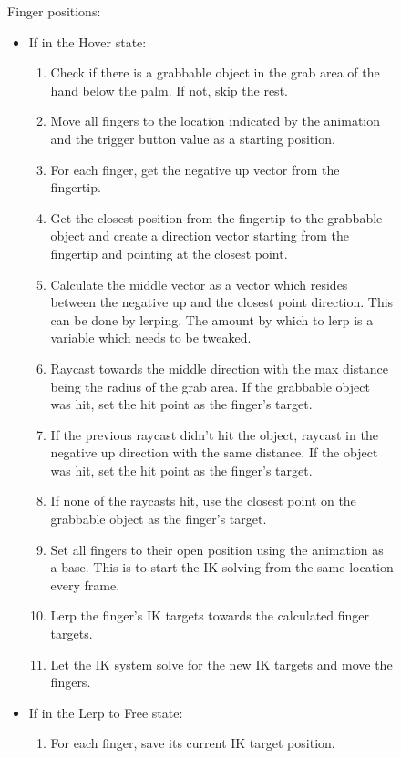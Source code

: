 \begin{figure}[H]
\centering
\footnotesize
\begin{flushleft}
Finger positions:
\end{flushleft}
\begin{itemize}[noitemsep]
\item If in the Hover state:
\begin{enumerate}[noitemsep]
\item Check if there is a grabbable object in the grab area of the hand below the palm. If not, skip the rest.
\item Move all fingers to the location indicated by the animation and the trigger button value as a starting position.
\item For each finger, get the negative up vector from the fingertip.
\item Get the closest position from the fingertip to the grabbable object and create a direction vector starting from the fingertip and pointing at the closest point.
\item Calculate the middle vector as a vector which resides between the negative up and the closest point direction. This can be done by lerping. The amount by which to lerp is a variable which needs to be tweaked.
\item Raycast towards the middle direction with the max distance being the radius of the grab area. If the grabbable object was hit, set the hit point as the finger's target.
\item If the previous raycast didn't hit the object, raycast in the negative up direction with the same distance. If the object was hit, set the hit point as the finger's target.
\item If none of the raycasts hit, use the closest point on the grabbable object as the finger's target.
\item Set all fingers to their open position using the animation as a base. This is to start the IK solving from the same location every frame.
\item Lerp the finger's IK targets towards the calculated finger targets.
\item Let the IK system solve for the new IK targets and move the fingers.
\end{enumerate}
\item If in the Lerp to Free state:
\begin{enumerate}[noitemsep]
\item For each finger, save its current IK target position.

\end{enumerate}
\end{itemize}
\end{figure}
